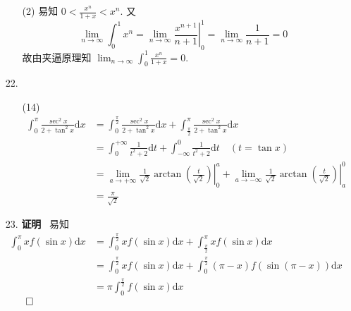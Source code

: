 \documentclass[11pt,oneside,fontset=fandol]{ctexbook} %
\renewcommand\theenumi{\thesection.\arabic{enumi}}
\begin{document}
\begin{enumerate}[label=\theenumi]
\begin{enumerate}
        \item[(2)]
        易知 $0 < \frac{x^n}{1+x} < x^n$. 又
        \[
            \lim_{n \to \infty} \int_0^1 x^n = \lim_{n \to \infty} \left. \frac{x^{n+1}}{n+1} \right|_0^1 = \lim_{n \to \infty} \frac 1 {n+1} = 0
        \]
        故由夹逼原理知 $\lim_{n \to \infty} \int_0^1 \frac{x^n}{1+x} = 0$.
    \end{enumerate}
    \item[22.]
    \begin{enumerate}
        \item[(14)]
        \begin{align*}
            \int_0^{\pi} \frac{\sec^2 x}{2 + \tan^2 x} \mathrm dx &= \int_0^{\frac \pi 2} \frac{\sec^2 x}{2 + \tan^2 x} \mathrm dx + \int_{\frac \pi 2}^{\pi} \frac{\sec^2 x}{2 + \tan^2 x} \mathrm dx \\
            &= \int_{0}^{+\infty} \frac 1 {t^2 + 2} \mathrm dt + \int_{-\infty}^0 \frac 1 {t^2 + 2} \mathrm dt \quad (t = \tan x) \\
            &= \lim_{a \to +\infty} \left. \frac 1 {\sqrt 2} \arctan \left( \frac t {\sqrt 2} \right) \right|_0^a + \lim_{a \to -\infty} \left. \frac 1 {\sqrt 2} \arctan \left( \frac t {\sqrt 2} \right) \right|_a^0 \\
            &= \frac \pi {\sqrt 2}
        \end{align*}
    \end{enumerate}
    \item[23.]
    \textbf{证明} \ 易知
    \begin{align*}
        \int_0^{\pi} x f(\sin x) \mathrm dx &= \int_0^{\frac \pi 2} x f(\sin x) \mathrm dx + \int_{\frac \pi 2}^{\pi} x f(\sin x) \mathrm dx \\
        &= \int_0^{\frac \pi 2} x f(\sin x) \mathrm dx + \int_0^{\frac \pi 2} (\pi - x) f( \sin(\pi - x) ) \mathrm dx \\
        &= \pi \int_0^{\frac \pi 2} f(\sin x) \mathrm dx
    \end{align*}
    $\hfill\qed$


\end{enumerate}
\end{document}
